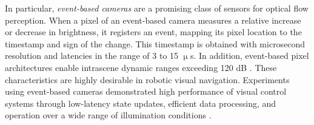 In particular, \emph{event-based cameras} are a promising class of sensors for optical flow perception. When a pixel of an event-based camera measures a relative increase or decrease in brightness, it registers an event, mapping its pixel location to the timestamp and sign of the change. This timestamp is obtained with microsecond resolution and latencies in the range of 3 to 15 $\upmu$s. In addition, event-based pixel architectures enable intrascene dynamic ranges exceeding 120 dB \cite{Yang2015}. These characteristics are highly desirable in robotic visual navigation. Experiments using event-based cameras demonstrated high performance of visual control systems through low-latency state updates, efficient data processing, and operation over a wide range of illumination conditions \cite{Conradt2009,Delbruck2013}. 

%
%
%




